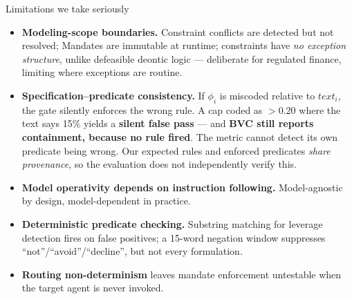 \documentclass[aspectratio=169,10pt]{beamer}
\newcommand{\key}[1]{\textcolor{aiAccent}{\textbf{#1}}}
\begin{document}
\begin{frame}{Limitations we take seriously}
  \small
  \begin{itemize}
    \item \textbf{Modeling-scope boundaries.} Constraint conflicts are detected
      but not resolved; Mandates are immutable at runtime; constraints have
      \emph{no exception structure}, unlike defeasible deontic logic --- deliberate
      for regulated finance, limiting where exceptions are routine.
    \medskip
    \item \textbf{Specification--predicate consistency.} If $\phi_i$ is miscoded
      relative to $\mathit{text}_i$, the gate silently enforces the wrong rule.
      A cap coded as $>0.20$ where the text says 15\% yields a \key{silent false
      pass} --- and \key{BVC still reports containment, because no rule fired}.
      The metric cannot detect its own predicate being wrong. Our expected rules
      and enforced predicates \emph{share provenance}, so the evaluation does not
      independently verify this.
    \medskip
    \item \textbf{Model operativity depends on instruction following.}
      Model-agnostic by design, model-dependent in practice.
    \medskip
    \item \textbf{Deterministic predicate checking.} Substring matching for
      leverage detection fires on false positives; a 15-word negation window
      suppresses ``not''/``avoid''/``decline'', but not every formulation.
    \medskip
    \item \textbf{Routing non-determinism} leaves mandate enforcement untestable
      when the target agent is never invoked.
  \end{itemize}
\end{frame}
\end{document}
